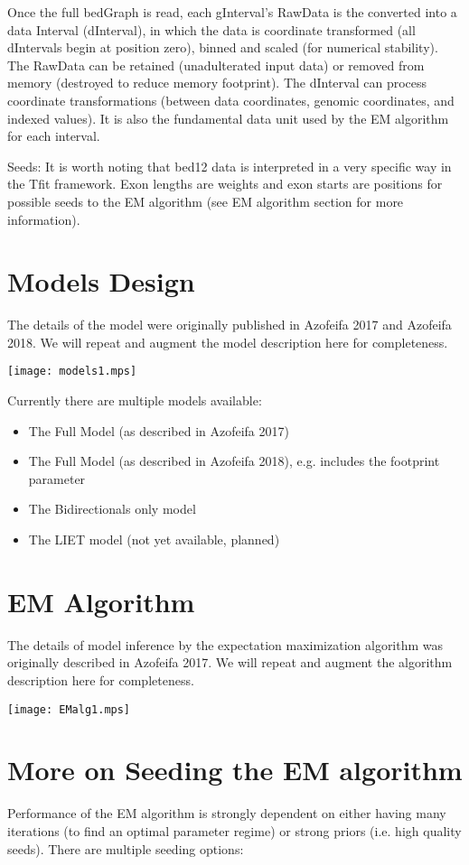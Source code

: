 \documentclass[11pt]{article}
\begin{document}
Once the full bedGraph is read, each gInterval's RawData is the converted into
a data Interval (dInterval), in which the data is coordinate transformed (all
dIntervals begin at position zero), binned and scaled (for numerical
stability).  The RawData can be retained (unadulterated input data) or removed 
from memory (destroyed to reduce memory footprint).  The dInterval can 
process coordinate transformations (between data coordinates, genomic 
coordinates, and indexed values).  It is also the fundamental data unit 
used by the EM algorithm for each interval.

Seeds: It is worth noting that bed12 data is interpreted in a very specific way
in the Tfit framework.   Exon lengths are weights and exon starts are 
positions for possible seeds to the EM algorithm (see EM algorithm 
section for more information).

\clearpage
\section{Models Design}
The details of the model were originally published in Azofeifa 2017 and
Azofeifa 2018.  We will repeat and augment the model description here for
completeness.  

\texttt{[image: models1.mps]}

Currently there are multiple models available:

\begin{itemize}
\item The Full Model (as described in Azofeifa 2017)
\item The Full Model (as described in Azofeifa 2018), e.g. includes
the footprint parameter
\item The Bidirectionals only model
\item The LIET model (not yet available, planned)
\end{itemize}

\section{EM Algorithm}
The details of model inference by the expectation maximization algorithm was
originally described in Azofeifa 2017.  We will repeat and augment the 
algorithm description here for completeness.

\texttt{[image: EMalg1.mps]}

\section{More on Seeding the EM algorithm}
Performance of the EM algorithm is strongly dependent on either having 
many iterations (to find an optimal parameter regime) or strong priors
(i.e. high quality seeds).  There are multiple seeding options:
\end{document}
